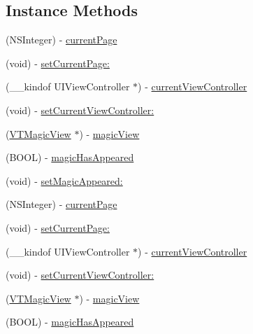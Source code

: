 \subsection*{Instance Methods}
\begin{DoxyCompactItemize}
\item 
(N\+S\+Integer) -\/ \mbox{\hyperlink{protocol_v_t_magic_protocol_01-p_a98f587198f915434883688d84011c27e}{current\+Page}}
\item 
(void) -\/ \mbox{\hyperlink{protocol_v_t_magic_protocol_01-p_a6edd711844c9f2a939330cd59503de49}{set\+Current\+Page\+:}}
\item 
(\+\_\+\+\_\+kindof U\+I\+View\+Controller $\ast$) -\/ \mbox{\hyperlink{protocol_v_t_magic_protocol_01-p_a5b2aadaa842bf3a509beeced253c61a0}{current\+View\+Controller}}
\item 
(void) -\/ \mbox{\hyperlink{protocol_v_t_magic_protocol_01-p_a2e54d402f3dcf7a12304b008debab60c}{set\+Current\+View\+Controller\+:}}
\item 
(\mbox{\hyperlink{interface_v_t_magic_view}{V\+T\+Magic\+View}} $\ast$) -\/ \mbox{\hyperlink{protocol_v_t_magic_protocol_01-p_af6d4673d61ebc6fc4147788e653cf3b7}{magic\+View}}
\item 
(B\+O\+OL) -\/ \mbox{\hyperlink{protocol_v_t_magic_protocol_01-p_afd680bc89cd364f7eebdebcb248969b5}{magic\+Has\+Appeared}}
\item 
(void) -\/ \mbox{\hyperlink{protocol_v_t_magic_protocol_01-p_a4c56f62764bbc1306d593c7a940a117d}{set\+Magic\+Appeared\+:}}
\item 
(N\+S\+Integer) -\/ \mbox{\hyperlink{protocol_v_t_magic_protocol_01-p_a98f587198f915434883688d84011c27e}{current\+Page}}
\item 
(void) -\/ \mbox{\hyperlink{protocol_v_t_magic_protocol_01-p_a6edd711844c9f2a939330cd59503de49}{set\+Current\+Page\+:}}
\item 
(\+\_\+\+\_\+kindof U\+I\+View\+Controller $\ast$) -\/ \mbox{\hyperlink{protocol_v_t_magic_protocol_01-p_a5b2aadaa842bf3a509beeced253c61a0}{current\+View\+Controller}}
\item 
(void) -\/ \mbox{\hyperlink{protocol_v_t_magic_protocol_01-p_a2e54d402f3dcf7a12304b008debab60c}{set\+Current\+View\+Controller\+:}}
\item 
(\mbox{\hyperlink{interface_v_t_magic_view}{V\+T\+Magic\+View}} $\ast$) -\/ \mbox{\hyperlink{protocol_v_t_magic_protocol_01-p_af6d4673d61ebc6fc4147788e653cf3b7}{magic\+View}}
\item 
(B\+O\+OL) -\/ \mbox{\hyperlink{protocol_v_t_magic_protocol_01-p_afd680bc89cd364f7eebdebcb248969b5}{magic\+Has\+Appeared}}

\end{DoxyCompactItemize}
